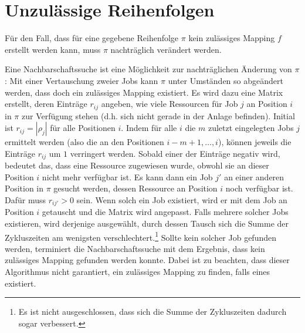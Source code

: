 \documentclass{scrreprt}
\begin{document}
\section{Unzulässige Reihenfolgen}
\label{sec:UnzulaessigeReihenfolgen}
Für den Fall, dass für eine gegebene Reihenfolge $\pi$ kein zulässiges Mapping $f$ erstellt werden kann, muss $\pi$ nachträglich verändert werden.

Eine Nachbarschaftssuche ist eine Möglichkeit zur nachträglichen Änderung von $\pi$:
Mit einer Vertauschung zweier Jobs kann $\pi$ unter Umständen so abgeändert werden, dass doch ein zulässiges Mapping existiert.
Es wird dazu eine Matrix erstellt, deren Einträge $r_{ij}$ angeben, wie viele Ressourcen für Job $j$ an Position $i$ in $\pi$ zur Verfügung stehen
(d.h. sich nicht gerade in der Anlage befinden).
Initial ist $r_{ij}=|\rho_j|$ für alle Positionen $i$.
Indem für alle $i$ die $m$ zuletzt eingelegten Jobs $j$ ermittelt werden (also die an den Positionen $i-m+1,\ldots,i$),
können jeweils die Einträge $r_{ij}$ um $1$ verringert werden.
Sobald einer der Einträge negativ wird, bedeutet das, dass eine Ressource zugewiesen wurde, obwohl sie an dieser Position $i$ nicht mehr verfügbar ist.
Es kann dann ein Job $j'$ an einer anderen Position in $\pi$ gesucht werden, dessen Ressource an Position $i$ noch verfügbar ist.
Dafür muss $r_{ij'}>0$ sein.
Wenn solch ein Job existiert, wird er mit dem Job an Position $i$ getauscht und die Matrix wird angepasst.
Falls mehrere solcher Jobs existieren, wird derjenige ausgewählt, durch dessen Tausch sich die Summe der Zykluszeiten am wenigsten verschlechtert.\footnote{
Es ist nicht ausgeschlossen, dass sich die Summe der Zykluszeiten dadurch sogar verbessert.}
Sollte kein solcher Job gefunden werden, terminiert die Nachbarschaftssuche mit dem Ergebnis, dass kein zulässiges Mapping gefunden werden konnte.
Dabei ist zu beachten, dass dieser Algorithmus nicht garantiert, ein zulässiges Mapping zu finden, falls eines existiert.


\end{document}
